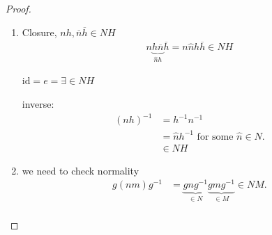 \begin{proof} \mbox{}
  \begin{enumerate} \def\labelenumi{\roman{enumi}.}
  \item
    Closure, \(nh, \overline{n} \overline{h} \in NH\)
    \begin{align*}
      n \underbrace{h \overline{n}}_{\hat{n} h} \overline{h} = n \hat{n} h \overline{h} \in NH
    \end{align*}

    \(\text{id} = e = \exists \in NH\)

    inverse:
    \begin{align*}
        (nh)^{-1} &= h^{-1} n^{-1} \\
        &= \hat{n} h^{-1} \text{ for some } \hat{n} \in N. \\
        &\in NH
    \end{align*}
  \item
    we need to check normality
    \begin{align*}
      g (nm) g^{-1} &= \underbrace{g n g^{-1}}_{\in N} \underbrace{g m g^{-1}}_{\in M} \in NM.\\
    \end{align*}
  \end{enumerate}
\end{proof}